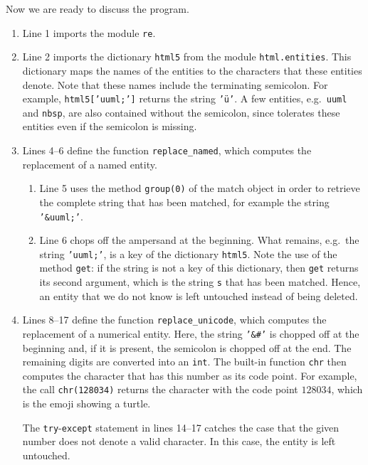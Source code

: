 Now we are ready to discuss the program.
\begin{enumerate}
\item Line 1 imports the module \texttt{re}.
\item Line 2 imports the dictionary \texttt{html5} from the module
      \texttt{html.entities}.  This dictionary maps the names of the  entities to the
      characters that these entities denote.  Note that these names include the terminating semicolon.  For
      example, \texttt{html5['uuml;']} returns the string \texttt{'\"u'}.  A few entities, e.g.~\texttt{uuml} and
      \texttt{nbsp}, are also contained without the semicolon, since  tolerates these
      entities even if the semicolon is missing.
\item Lines 4--6 define the function \texttt{replace\_named}, which computes the replacement of a named
      entity.
      \begin{enumerate}
      \item Line 5 uses the method \texttt{group(0)} of the match object in order to retrieve the complete
            string that has been matched, for example the string \texttt{'\&uuml;'}.
      \item Line 6 chops off the ampersand at the beginning.  What remains, e.g.~the string
            \texttt{'uuml;'}, is a key of the dictionary \texttt{html5}.  Note the use of the method
            \texttt{get}: if the string is not a key of this dictionary, then \texttt{get} returns its second
            argument, which is the string \texttt{s} that has been matched.  Hence, an entity that we do not know
            is left untouched instead of being deleted.
      \end{enumerate}
\item Lines 8--17 define the function \texttt{replace\_unicode}, which computes the replacement of a numerical
      entity.  Here, the string \texttt{'\&\#'} is chopped off at the beginning and, if it is present, the
      semicolon is chopped off at the end.  The remaining digits are converted into an \texttt{int}.  The built-in function \texttt{chr} then computes the
       character that has this number as its code point.  For example, the call
      \texttt{chr(128034)} returns the character with the code point $128034$, which is the emoji showing a
      turtle.

      The \texttt{try}-\texttt{except} statement in lines 14--17 catches the case that the given number does not
      denote a valid  character.  In this case, the entity is left untouched.
\end{enumerate}

